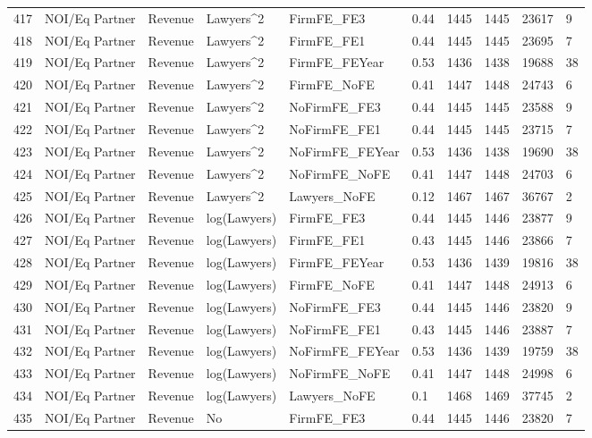 \begin{table}[ht]
\begin{tabular}{rlllllllll}
  417 & NOI/Eq Partner & Revenue & Lawyers^2 & FirmFE\_FE3 & 0.44 & 1445 & 1445 & 23617 & 9 \\ 
  418 & NOI/Eq Partner & Revenue & Lawyers^2 & FirmFE\_FE1 & 0.44 & 1445 & 1445 & 23695 & 7 \\ 
  419 & NOI/Eq Partner & Revenue & Lawyers^2 & FirmFE\_FEYear & 0.53 & 1436 & 1438 & 19688 & 38 \\ 
  420 & NOI/Eq Partner & Revenue & Lawyers^2 & FirmFE\_NoFE & 0.41 & 1447 & 1448 & 24743 & 6 \\ 
  421 & NOI/Eq Partner & Revenue & Lawyers^2 & NoFirmFE\_FE3 & 0.44 & 1445 & 1445 & 23588 & 9 \\ 
  422 & NOI/Eq Partner & Revenue & Lawyers^2 & NoFirmFE\_FE1 & 0.44 & 1445 & 1445 & 23715 & 7 \\ 
  423 & NOI/Eq Partner & Revenue & Lawyers^2 & NoFirmFE\_FEYear & 0.53 & 1436 & 1438 & 19690 & 38 \\ 
  424 & NOI/Eq Partner & Revenue & Lawyers^2 & NoFirmFE\_NoFE & 0.41 & 1447 & 1448 & 24703 & 6 \\ 
  425 & NOI/Eq Partner & Revenue & Lawyers^2 & Lawyers\_NoFE & 0.12 & 1467 & 1467 & 36767 & 2 \\ 
  426 & NOI/Eq Partner & Revenue & log(Lawyers) & FirmFE\_FE3 & 0.44 & 1445 & 1446 & 23877 & 9 \\ 
  427 & NOI/Eq Partner & Revenue & log(Lawyers) & FirmFE\_FE1 & 0.43 & 1445 & 1446 & 23866 & 7 \\ 
  428 & NOI/Eq Partner & Revenue & log(Lawyers) & FirmFE\_FEYear & 0.53 & 1436 & 1439 & 19816 & 38 \\ 
  429 & NOI/Eq Partner & Revenue & log(Lawyers) & FirmFE\_NoFE & 0.41 & 1447 & 1448 & 24913 & 6 \\ 
  430 & NOI/Eq Partner & Revenue & log(Lawyers) & NoFirmFE\_FE3 & 0.44 & 1445 & 1446 & 23820 & 9 \\ 
  431 & NOI/Eq Partner & Revenue & log(Lawyers) & NoFirmFE\_FE1 & 0.43 & 1445 & 1446 & 23887 & 7 \\ 
  432 & NOI/Eq Partner & Revenue & log(Lawyers) & NoFirmFE\_FEYear & 0.53 & 1436 & 1439 & 19759 & 38 \\ 
  433 & NOI/Eq Partner & Revenue & log(Lawyers) & NoFirmFE\_NoFE & 0.41 & 1447 & 1448 & 24998 & 6 \\ 
  434 & NOI/Eq Partner & Revenue & log(Lawyers) & Lawyers\_NoFE & 0.1 & 1468 & 1469 & 37745 & 2 \\ 
  435 & NOI/Eq Partner & Revenue & No & FirmFE\_FE3 & 0.44 & 1445 & 1446 & 23820 & 7 \\ 

\end{tabular}
\end{table}
